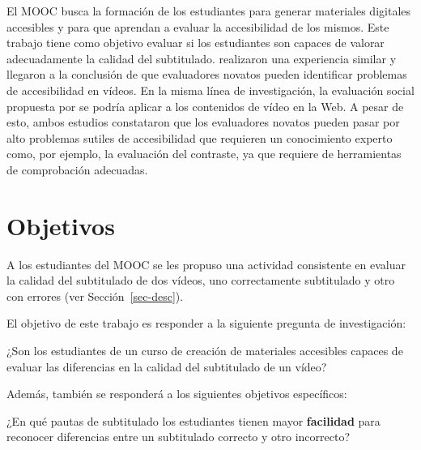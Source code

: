 \documentclass[
  12pt,
  a4paper,
  extrafontsizes,
  onecolumn,
  openright,
  table]{memoir}
\begin{document}
El MOOC busca la formación de los estudiantes para generar materiales
digitales accesibles y para que aprendan a evaluar la accesibilidad de
los mismos. Este trabajo tiene como objetivo evaluar si los estudiantes
son capaces de valorar adecuadamente la calidad del subtitulado.
\textcite{jperez2} realizaron una experiencia similar y llegaron a la
conclusión de que evaluadores novatos pueden identificar problemas de
accesibilidad en vídeos. En la misma línea de investigación, la
evaluación social propuesta por \textcite{kawanaka2008} se podría
aplicar a los contenidos de vídeo en la Web. A pesar de esto, ambos
estudios constataron que los evaluadores novatos pueden pasar por alto
problemas sutiles de accesibilidad que requieren un conocimiento experto
como, por ejemplo, la evaluación del contraste, ya que requiere de
herramientas de comprobación adecuadas.

\hypertarget{sec-objetivos}{%
\section{Objetivos}\label{sec-objetivos}}

A los estudiantes del MOOC se les propuso una actividad consistente en
evaluar la calidad del subtitulado de dos vídeos, uno correctamente
subtitulado y otro con errores (ver Sección~\ref{sec-desc}).

El objetivo de este trabajo es responder a la siguiente pregunta de
investigación:

\begin{tcolorbox}[enhanced jigsaw, arc=.35mm, bottomtitle=1mm, left=2mm, toptitle=1mm, breakable, opacitybacktitle=0.6, rightrule=.15mm, toprule=.15mm, colbacktitle=quarto-callout-note-color!10!white, leftrule=.75mm, colframe=quarto-callout-note-color-frame, colback=white, titlerule=0mm, opacityback=0, bottomrule=.15mm, coltitle=black, title=\textcolor{quarto-callout-note-color}{\faInfo}\hspace{0.5em}{Pregunta de investigación}]

¿Son los estudiantes de un curso de creación de materiales accesibles
capaces de evaluar las diferencias en la calidad del subtitulado de un
vídeo?

\end{tcolorbox}

Además, también se responderá a los siguientes objetivos específicos:

\begin{tcolorbox}[enhanced jigsaw, arc=.35mm, bottomtitle=1mm, left=2mm, toptitle=1mm, breakable, opacitybacktitle=0.6, rightrule=.15mm, toprule=.15mm, colbacktitle=quarto-callout-tip-color!10!white, leftrule=.75mm, colframe=quarto-callout-tip-color-frame, colback=white, titlerule=0mm, opacityback=0, bottomrule=.15mm, coltitle=black, title=\textcolor{quarto-callout-tip-color}{\faLightbulb}\hspace{0.5em}{Objetivo específico}]

¿En qué pautas de subtitulado los estudiantes tienen mayor
\textbf{facilidad} para reconocer diferencias entre un subtitulado
correcto y otro incorrecto?

\end{tcolorbox}
\end{document}
